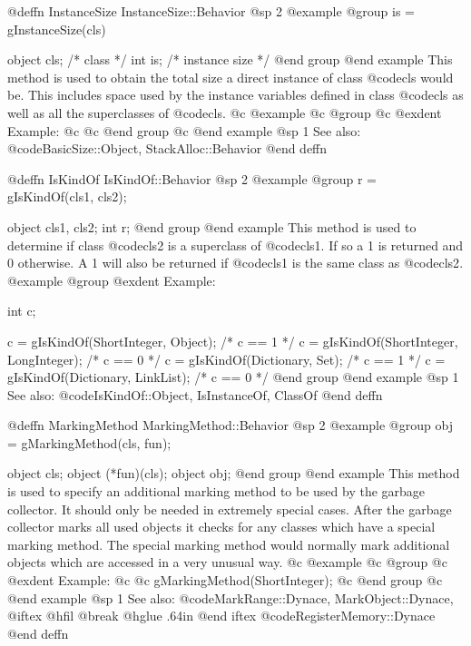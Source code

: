 @deffn {InstanceSize} InstanceSize::Behavior
@sp 2
@example
@group
is = gInstanceSize(cls)

object  cls;    /* class                */
int     is;     /* instance size        */
@end group
@end example
This method is used to obtain the total size a direct instance of class
@code{cls} would be.  This includes space used by the instance variables
defined in class @code{cls} as well as all the superclasses of
@code{cls}.
@c @example
@c @group
@c @exdent Example:
@c 
@c @end group
@c @end example
@sp 1
See also:  @code{BasicSize::Object, StackAlloc::Behavior}
@end deffn










@deffn {IsKindOf} IsKindOf::Behavior
@sp 2
@example
@group
r = gIsKindOf(cls1, cls2);

object  cls1, cls2;
int     r;
@end group
@end example
This method is used to determine if class @code{cls2} is a
superclass of @code{cls1}.  If so a 1 is returned and 0 otherwise.
A 1 will also be returned if @code{cls1} is the same class as @code{cls2}.
@example
@group
@exdent Example:

int     c;

c = gIsKindOf(ShortInteger, Object);      /* c == 1  */
c = gIsKindOf(ShortInteger, LongInteger); /* c == 0  */
c = gIsKindOf(Dictionary, Set);           /* c == 1  */
c = gIsKindOf(Dictionary, LinkList);      /* c == 0  */
@end group
@end example
@sp 1
See also:  @code{IsKindOf::Object, IsInstanceOf, ClassOf}
@end deffn











@deffn {MarkingMethod} MarkingMethod::Behavior
@sp 2
@example
@group
obj = gMarkingMethod(cls, fun);

object  cls;
object  (*fun)(cls);
object  obj;
@end group
@end example
This method is used to specify an additional marking method to be used
by the garbage collector.  It should only be needed in extremely special
cases.  After the garbage collector marks all used objects it checks
for any classes which have a special marking method.  The special
marking method would normally mark additional objects which are accessed
in a very unusual way.
@c @example
@c @group
@c @exdent Example:
@c 
@c gMarkingMethod(ShortInteger);
@c @end group
@c @end example
@sp 1
See also:  @code{MarkRange::Dynace, MarkObject::Dynace,}
@iftex
@hfil @break @hglue .64in    
@end iftex
@code{RegisterMemory::Dynace}
@end deffn








